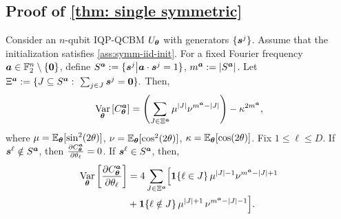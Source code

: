 \documentclass[10pt, twocolumn, a4paper]{article}
\theoremstyle{plain}
\theoremstyle{definition}
\theoremstyle{remark}
\begin{document}
\subsection{Proof of \cref{thm: single symmetric}}
Consider an $n$-qubit IQP-QCBM $U_{\bm{\theta}}$ with generators $\{{\bm{s}^j}\}$. Assume that the initialization satisfies \cref{ass:symm-iid-init}. For a fixed Fourier frequency ${\bm{a}} \in \mathbb{F}_2^n \setminus \{\mathbf{0}\}$, define $S^{{\bm{a}}} := \{ {\bm{s}^j} \big| {\bm{a}} \cdot {\bm{s}^j} = 1 \}$, $
m^{\bm{a}} := \abs{S^{{\bm{a}}}}$. Let $
\Xi^\vta:= \{J\subseteq S^\vta:\ \sum_{j\in J}\vtsj=\mathbf 0 \}.$ Then, 
\begin{equation}
     \operatorname*{Var}_{\bm{\theta}} \left[ C^{\bm{a}}_{\bm{\theta}} \right] = 
\left(\sum_{J\in \Xi^{\bm{a}}} \mu^{|J|} \nu^{m^{\bm{a}}-|J|}\right) - \kappa^{2m^{\bm{a}}},
\end{equation}
where $\mu=\operatorname*{\mathbb{E}}_{{\bm{\theta}}}[\sin^2(2\theta)]$, $\nu=\operatorname*{\mathbb{E}}_{{\bm{\theta}}}[\cos^2(2\theta)]$, $\kappa=\operatorname*{\mathbb{E}}_{{\bm{\theta}}}[\cos(2\theta)]$. Fix $1\leq \ell \leq D$. If ${\bm{s}^\ell} \notin S^{\bm{a}}$, then $ \frac{\partial C^{\bm{a}}_{\bm{\theta}}}{\partial \theta_\ell}=0$. If ${\bm{s}^\ell} \in S^{\bm{a}}$, then, 
\begin{align}
\operatorname*{Var}_{\bm{\theta}} \left[ \frac{\partial C^{\bm{a}}_{\bm{\theta}}}{\partial \theta_\ell} \right]
&= 4\sum_{J\in \Xi^{\bm{a}}}
\Bigl[
\bm{1}\{\ell\in J\}\,\mu^{|J|-1}\nu^{m^{\bm{a}}-|J|+1} \notag
\\&+
\bm{1}\{\ell\notin J\}\,\mu^{|J|+1}\,\nu^{m^{\bm{a}}-|J|-1}\Bigr].
\label{eq: symmetric variance-decomposition}
\end{align}
\end{document}
